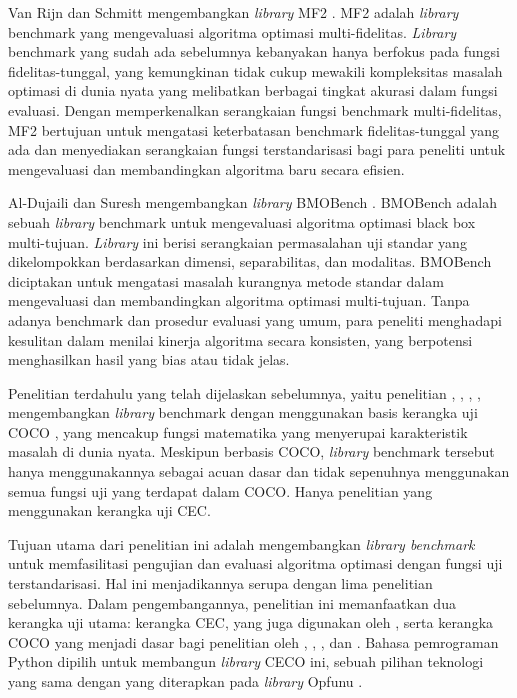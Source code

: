 Van Rijn dan Schmitt mengembangkan \textit{library} MF2 \citep{van_Rijn_2020}. MF2 adalah \textit{library} benchmark yang mengevaluasi algoritma optimasi multi-fidelitas. \textit{Library} benchmark yang sudah ada sebelumnya kebanyakan hanya berfokus pada fungsi fidelitas-tunggal, yang kemungkinan tidak cukup mewakili kompleksitas masalah optimasi di dunia nyata yang melibatkan berbagai tingkat akurasi dalam fungsi evaluasi. Dengan memperkenalkan serangkaian fungsi benchmark multi-fidelitas, MF2 bertujuan untuk mengatasi keterbatasan benchmark fidelitas-tunggal yang ada dan menyediakan serangkaian fungsi terstandarisasi bagi para peneliti untuk mengevaluasi dan membandingkan algoritma baru secara efisien.

Al-Dujaili dan Suresh mengembangkan \textit{library} BMOBench \citep{al-dujaili_2016}. BMOBench adalah sebuah \textit{library} benchmark untuk mengevaluasi algoritma optimasi black box multi-tujuan. \textit{Library} ini berisi serangkaian permasalahan uji standar yang dikelompokkan berdasarkan dimensi, separabilitas, dan modalitas. BMOBench diciptakan untuk mengatasi masalah kurangnya metode standar dalam mengevaluasi dan membandingkan algoritma optimasi multi-tujuan. Tanpa adanya benchmark dan prosedur evaluasi yang umum, para peneliti menghadapi kesulitan dalam menilai kinerja algoritma secara konsisten, yang berpotensi menghasilkan hasil yang bias atau tidak jelas.

Penelitian terdahulu yang telah dijelaskan sebelumnya, yaitu penelitian \citep{Bliek_2023}, \citep{ma_zeyan_guo_chen_jiacheng_zhenrui_peng_gong_ma_cao_2023}, \citep{van_Rijn_2020}, \citep{al-dujaili_2016}, mengembangkan \textit{library} benchmark dengan menggunakan basis kerangka uji COCO \citep{hansen2021coco}, yang mencakup fungsi matematika yang menyerupai karakteristik masalah di dunia nyata. Meskipun berbasis COCO, \textit{library} benchmark tersebut hanya menggunakannya sebagai acuan dasar \citep{ma_zeyan_guo_chen_jiacheng_zhenrui_peng_gong_ma_cao_2023} dan tidak sepenuhnya menggunakan semua fungsi uji yang terdapat dalam COCO. Hanya penelitian \citep{Van_Thieu_2024} yang menggunakan kerangka uji CEC.

Tujuan utama dari penelitian ini adalah mengembangkan \textit{library benchmark} untuk memfasilitasi pengujian dan evaluasi algoritma optimasi dengan fungsi uji terstandarisasi. Hal ini menjadikannya serupa dengan lima penelitian sebelumnya. Dalam pengembangannya, penelitian ini memanfaatkan dua kerangka uji utama: kerangka CEC, yang juga digunakan oleh \citep{Van_Thieu_2024}, serta kerangka COCO yang menjadi dasar bagi penelitian oleh \citep{Bliek_2023}, \citep{ma_zeyan_guo_chen_jiacheng_zhenrui_peng_gong_ma_cao_2023}, \citep{van_Rijn_2020}, dan \citep{al-dujaili_2016}. Bahasa pemrograman Python dipilih untuk membangun \textit{library} CECO ini, sebuah pilihan teknologi yang sama dengan yang diterapkan pada \textit{library} Opfunu \citep{Van_Thieu_2024}.


